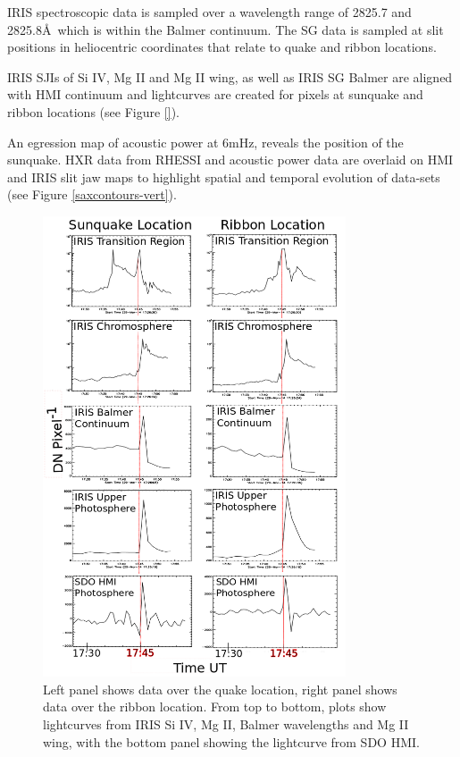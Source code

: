 

IRIS spectroscopic data is sampled over a wavelength range of 2825.7 and 2825.8\AA\ which is within the Balmer continuum. The SG data is sampled at slit positions in heliocentric coordinates that relate to quake and ribbon locations.




IRIS SJIs of Si IV, Mg II and Mg II wing, as well as IRIS SG Balmer are aligned with HMI continuum and lightcurves are created for pixels at sunquake and ribbon locations (see Figure \ref{}).

An egression map of acoustic power at 6mHz, reveals the position of the sunquake. HXR data from RHESSI and acoustic power data are overlaid on HMI and IRIS slit jaw maps to highlight spatial and temporal evolution of data-sets (see Figure \ref{saxcontours-vert}).\\

\begin{figure}%
  \begin{center}
  \includegraphics[width=0.8\textwidth]{lcseries-bold}
  \end{center}
  \caption{Left panel shows data over the quake location, right panel shows data over the ribbon location. From top to bottom, plots show lightcurves from IRIS Si IV, Mg II, Balmer wavelengths and Mg II wing, with the bottom panel showing the lightcurve from SDO HMI.}\label{lcseries-bold}
\end{figure}

